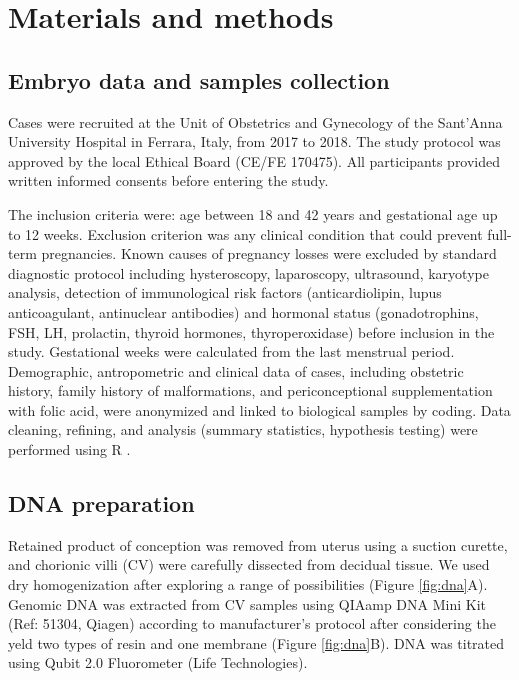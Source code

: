 \section*{Materials and methods}

\subsection*{Embryo data and samples collection}
Cases were recruited at the Unit of Obstetrics and Gynecology of the Sant’Anna University Hospital in Ferrara, Italy, from 2017 to 2018. The study protocol was approved by the local Ethical Board (CE/FE 170475). All participants provided written informed consents before entering the study.

The inclusion criteria were: age between 18 and 42 years and gestational age up to 12 weeks. Exclusion criterion was any clinical condition that could prevent full-term pregnancies. Known causes of pregnancy losses were excluded by standard diagnostic protocol including hysteroscopy, laparoscopy, ultrasound, karyotype analysis, detection of immunological risk factors (anticardiolipin, lupus anticoagulant, antinuclear antibodies) and hormonal status (gonadotrophins, FSH, LH, prolactin, thyroid hormones, thyroperoxidase) before inclusion in the study. Gestational weeks were calculated from the last menstrual period. Demographic, antropometric and clinical data of cases, including obstetric history, family history of malformations, and periconceptional supplementation with folic acid, were anonymized and linked to biological samples by coding. Data cleaning, refining, and analysis (summary statistics, hypothesis testing) were performed using R \cite{R}.


\subsection*{DNA preparation} 
Retained product of conception was removed from uterus using a suction curette, and chorionic villi (CV) were carefully dissected from decidual tissue. We used dry homogenization after exploring a range of possibilities (Figure \ref{fig:dna}A). 
Genomic DNA was extracted from CV samples using QIAamp DNA Mini Kit (Ref: 51304, Qiagen) according to manufacturer’s protocol after considering the yeld two types of resin and one membrane (Figure \ref{fig:dna}B). DNA was titrated using Qubit 2.0 Fluorometer (Life Technologies).

